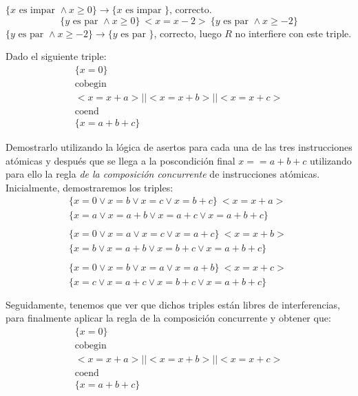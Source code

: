 \begin{ejercicio}
\begin{enumerate}
            $\{x \text{ es impar } \land x \geq 0\} \rightarrow \{x \text{ es impar }\}$, correcto.\\
            \begin{equation*}
                \{y \text{ es par } \land x \geq 0\}\ <x=x-2>\ \{y \text{ es par } \land x \geq -2\}
            \end{equation*}
            $\{y \text{ es par } \land x \geq -2\} \rightarrow \{y \text{ es par }\}$, correcto, luego $R$ no interfiere con este triple.
            
    \end{enumerate}
\end{ejercicio}

\begin{ejercicio}
    Dado el siguiente triple:
    \begin{gather*}
        \{x = 0\} \\
        \text{cobegin} \\
        <x = x + a> || <x = x + b> || <x = x + c> \\
        \text{coend} \\
        \{x = a + b + c\}
    \end{gather*}
    
    Demostrarlo utilizando la lógica de asertos para cada una de las tres instrucciones atómicas y después que se llega a la poscondición final $x == a + b + c$ utilizando para ello la regla \emph{de la composición concurrente} de instrucciones atómicas.\\

Inicialmente, demostraremos los triples:
\begin{gather*}
    \{x=0 \lor x=b \lor x=c \lor x=b+c\}\ <x=x+a>\ \\ \{x=a \lor x=a+b \lor x=a+c \lor x=a+b+c\} \\ \\
    \{x=0 \lor x=a \lor x=c \lor x=a+c\}\ <x=x+b>\ \\ \{x=b \lor x=a+b \lor x=b+c \lor x=a+b+c\} \\ \\
    \{x=0 \lor x=b \lor x=a \lor x=a+b\}\ <x=x+c>\ \\ \{x=c \lor x=a+c \lor x=b+c \lor x=a+b+c\} \\ \\
\end{gather*}
Seguidamente, tenemos que ver que dichos triples están libres de interferencias, para finalmente aplicar la regla de la composición concurrente y obtener que:
\begin{gather*}
        \{x = 0\} \\
        \text{cobegin} \\
        <x = x + a> || <x = x + b> || <x = x + c> \\
        \text{coend} \\
        \{x = a + b + c\}
    \end{gather*}
\end{ejercicio}

